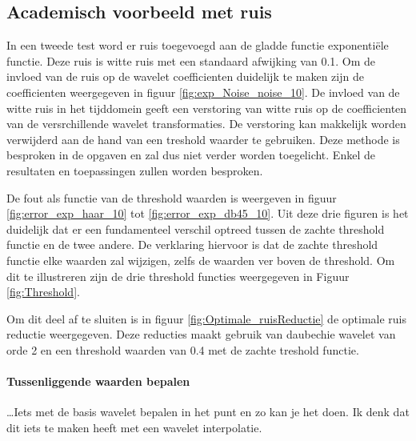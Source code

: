 \subsection{Academisch voorbeeld met ruis}

In een tweede test word er ruis toegevoegd aan de gladde functie exponenti\"ele functie.
Deze ruis is witte ruis met een standaard afwijking van 0.1.
Om de invloed van de ruis op de wavelet coefficienten duidelijk te maken zijn de coefficienten weergegeven in 
figuur \ref{fig:exp_Noise_noise_10}.
De invloed van de witte ruis in het tijddomein geeft  een verstoring van witte ruis op de coefficienten van de versrchillende wavelet transformaties.
De verstoring kan makkelijk worden verwijderd aan de hand van een treshold waarder te gebruiken.
Deze methode is besproken in de opgaven en zal dus niet verder worden toegelicht.
Enkel de resultaten en toepassingen zullen worden besproken.

De fout als functie van de threshold waarden is weergeven in figuur \ref{fig:error_exp_haar_10} tot \ref{fig:error_exp_db45_10}.
Uit deze drie figuren is het duidelijk dat er een fundamenteel verschil optreed tussen de zachte threshold functie en de twee andere.
De verklaring hiervoor is dat de zachte threshold functie elke waarden zal wijzigen, zelfs de waarden ver boven de threshold.
Om dit te illustreren zijn de drie threshold functies weergegeven in Figuur \ref{fig:Threshold}.

Om dit deel af te sluiten is in figuur \ref{fig:Optimale_ruisReductie} de optimale ruis reductie weergegeven.
Deze reducties maakt gebruik van daubechie wavelet van orde 2 en een threshold waarden van 0.4 met  de zachte treshold functie.


\paragraph{Tussenliggende waarden bepalen}

\dots Iets met de basis wavelet bepalen in het punt  en zo kan je het doen. Ik denk dat dit iets te maken heeft met een wavelet interpolatie.









